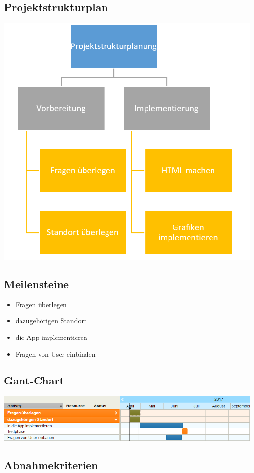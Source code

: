 \subsection{Projektstrukturplan}
\begin{center}
	\includegraphics[width=0.7\linewidth]{projekt}
\end{center}


\subsection{Meilensteine}
\begin{itemize}
	\item Fragen überlegen
	\item dazugehörigen Standort 
	\item die App implementieren
	\item Fragen von User einbinden
\end{itemize}

\subsection{Gant-Chart}

\begin{center}
	\includegraphics[width=1.0\linewidth]{gant}
\end{center}

\subsection{Abnahmekriterien}
